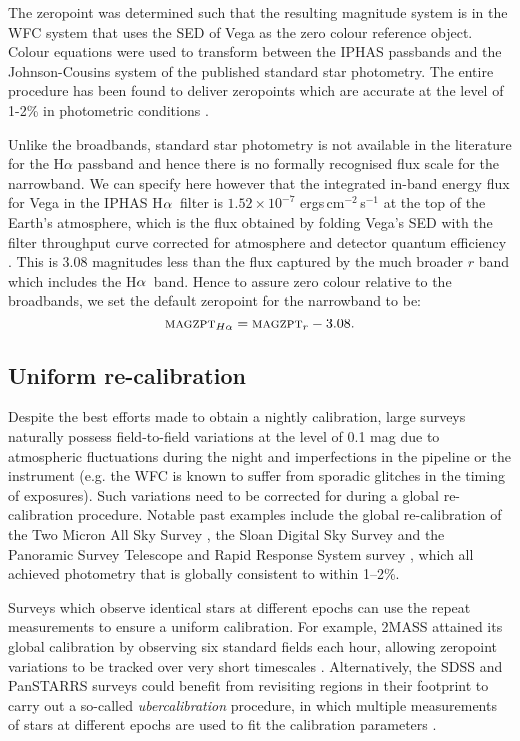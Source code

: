 \documentclass[useAMS,usenatbib]{mn2e}
\def\ha{\mbox{H$\rm \alpha$}}
\begin{document}
The zeropoint was determined such that the resulting magnitude system
is in the WFC system that uses the SED of Vega 
as the zero colour reference object. 
Colour equations were used to transform between the IPHAS passbands 
and the Johnson-Cousins system 
of the published standard star photometry.
The entire procedure has been found to deliver zeropoints which 
are accurate at the level of 1-2\% 
in photometric conditions \citep{Gonzalez-Solares2011}.

Unlike the broadbands, 
standard star photometry is not available in the literature 
for the H$\alpha$ passband
and hence there is no formally recognised flux scale 
for the narrowband.
We can specify here however 
that the integrated in-band energy flux for Vega 
in the IPHAS \ha\ filter 
is $1.52 \times 10^{-7}$ ergs\,cm$^{-2}$\,s$^{-1}$ 
at the top of the Earth's atmosphere,
which is the flux obtained by folding 
Vega's SED with the filter throughput curve 
corrected for atmosphere and detector quantum efficiency
\citep[using the method explained by][]{Drew2005}.
This is 3.08 magnitudes less than the flux captured 
by the much broader $r$ band
which includes the \ha\ band.
Hence to assure zero colour relative to the broadbands,
we set the default zeropoint for the narrowband to be:
\begin{equation}
\textsc{magzpt}_{H\alpha} = \textsc{magzpt}_r - 3.08.
\label{eqn:zpha}
\end{equation}

\subsection{Uniform re-calibration}

Despite the best efforts made to obtain a nightly calibration,
large surveys naturally possess field-to-field variations
at the level of 0.1 mag
due to atmospheric fluctuations during the night
and imperfections in the pipeline or the instrument
(e.g. the WFC is known to suffer from sporadic glitches
in the timing of exposures).
Such variations need to be corrected for 
during a global re-calibration procedure.
Notable past examples include the global re-calibration 
of the Two Micron All Sky Survey \citep[2MASS;][]{Nikolaev2000},
the Sloan Digital Sky Survey \citep[SDSS;][]{Padmanabhan2008}
and the Panoramic Survey Telescope 
and Rapid Response System survey \citep[Pan-STARRS;][]{Schlafly2012},
which all achieved photometry 
that is globally consistent to within 1--2\%.

Surveys which observe identical stars at different epochs
can use the repeat measurements to ensure a uniform calibration.
For example, 2MASS attained its global calibration
by observing six standard fields each hour, 
allowing zeropoint variations to be tracked 
over very short timescales \citep{Nikolaev2000}.
Alternatively, the SDSS and PanSTARRS surveys could benefit
from revisiting regions in their footprint to 
carry out a so-called \emph{ubercalibration} procedure,
in which multiple measurements of stars at different epochs
are used to fit the calibration parameters
\citep{Padmanabhan2008,Schlafly2012}.
\end{document}
